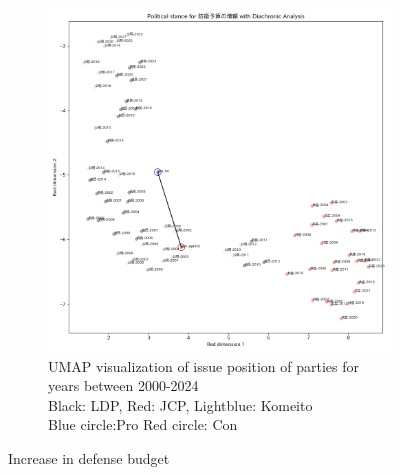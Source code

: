 \documentclass[final,5p,times,twocolumn,authoryear]{elsarticle}
\begin{document}
\begin{figure}[h]
\begin{subfigure}{0.48\textwidth}
		  \includegraphics[width=\textwidth]{figs/results/diachronic_defence/defencebudget_diachronic_umap.png}
		  \caption{UMAP visualization of issue position of parties for years between 2000-2024 \\\hspace{\textwidth} 
		  Black: LDP, Red: JCP, Lightblue: Komeito\\\hspace{\textwidth}
		  Blue circle:Pro Red circle: Con }
		  \label{fig:sub2}
		\end{subfigure}
	\caption{Increase in defense budget}
	\label{fig: results-diachronic-defense-budget}
\end{figure}
\end{document}
